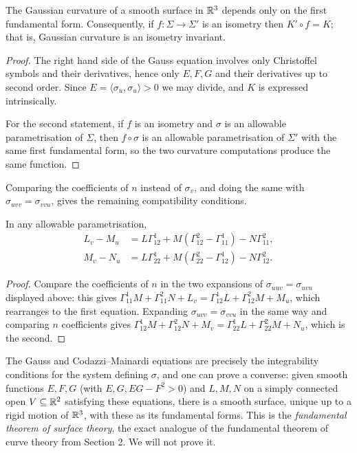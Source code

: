 \documentclass[a4paper]{scrartcl}
\begin{document}
\begin{theorem}
    The Gaussian curvature of a smooth surface in $\mathbb{R}^3$ depends only on the first fundamental form. Consequently, if $f: \Sigma \rightarrow \Sigma'$ is an isometry then $K' \circ f = K$; that is, Gaussian curvature is an isometry invariant.
\end{theorem}
\begin{proof}
    The right hand side of the Gauss equation involves only Christoffel symbols and their derivatives, hence only $E, F, G$ and their derivatives up to second order. Since $E = \langle \sigma_u, \sigma_u\rangle > 0$ we may divide, and $K$ is expressed intrinsically.

    For the second statement, if $f$ is an isometry and $\sigma$ is an allowable parametrisation of $\Sigma$, then $f\circ\sigma$ is an allowable parametrisation of $\Sigma'$ with the same first fundamental form, so the two curvature computations produce the same function.
\end{proof}

Comparing the coefficients of $n$ instead of $\sigma_v$, and doing the same with $\sigma_{uvv} = \sigma_{vvu}$, gives the remaining compatibility conditions.

\begin{theorem}
    In any allowable parametrisation,
    \begin{align*}
        L_v - M_u &= L\Gamma^1_{12} + M\left(\Gamma^2_{12}-\Gamma^1_{11}\right) - N\Gamma^2_{11}, \\
        M_v - N_u &= L\Gamma^1_{22} + M\left(\Gamma^2_{22}-\Gamma^1_{12}\right) - N\Gamma^2_{12}.
    \end{align*}
\end{theorem}
\begin{proof}
    Compare the coefficients of $n$ in the two expansions of $\sigma_{uuv} = \sigma_{uvu}$ displayed above: this gives $\Gamma^1_{11}M + \Gamma^2_{11}N + L_v = \Gamma^1_{12}L + \Gamma^2_{12}M + M_u$, which rearranges to the first equation. Expanding $\sigma_{uvv} = \sigma_{vvu}$ in the same way and comparing $n$ coefficients gives $\Gamma^1_{12}M + \Gamma^2_{12}N + M_v = \Gamma^1_{22}L + \Gamma^2_{22}M + N_u$, which is the second.
\end{proof}

\begin{remark}
    The Gauss and Codazzi--Mainardi equations are precisely the integrability conditions for the system defining $\sigma$, and one can prove a converse: given smooth functions $E, F, G$ (with $E, G, EG-F^2 > 0$) and $L, M, N$ on a simply connected open $V \subseteq \mathbb{R}^2$ satisfying these equations, there is a smooth surface, unique up to a rigid motion of $\mathbb{R}^3$, with these as its fundamental forms. This is the \emph{fundamental theorem of surface theory}, the exact analogue of the fundamental theorem of curve theory from Section 2. We will not prove it.
\end{remark}
\end{document}
